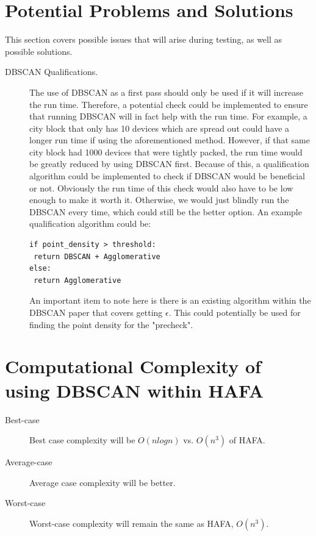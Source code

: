 \documentclass[letterpaper,twocolumn,10pt]{article}
\begin{document}
\section{Potential Problems and Solutions}
This section covers possible issues that will arise during testing, as well as possible solutions.
\begin{description}
\item[DBSCAN Qualifications.] The use of DBSCAN as a first pass should only be used if it will increase the run time. Therefore, a potential check could be implemented to ensure that running DBSCAN will in fact help with the run time. For example, a city block that only has 10 devices which are spread out could have a longer run time if using the aforementioned method. However, if that same city block had 1000 devices that were tightly packed, the run time would be greatly reduced by using DBSCAN first. Because of this, a qualification algorithm could be implemented to check if DBSCAN would be beneficial or not. Obviously the run time of this check would also have to be low enough to make it worth it. Otherwise, we would just blindly run the DBSCAN every time, which could still be the better option. An example qualification algorithm could be:
\begin{verbatim}
if point_density > threshold:
 return DBSCAN + Agglomerative
else:
 return Agglomerative
\end{verbatim}
An important item to note here is there is an existing algorithm within the DBSCAN paper that covers getting $\epsilon$. This could potentially be used for finding the point density for the "precheck".
\end{description}

\section{Computational Complexity of using DBSCAN within HAFA}

\begin{description}
\item[Best-case] Best case complexity will be $O (n log n)$ vs. $O(n^3)$ of HAFA.
\item[Average-case] Average case complexity will be better.
\item[Worst-case] Worst-case complexity will remain the same as HAFA, $O(n^3)$.
\end{description}
\end{document}
